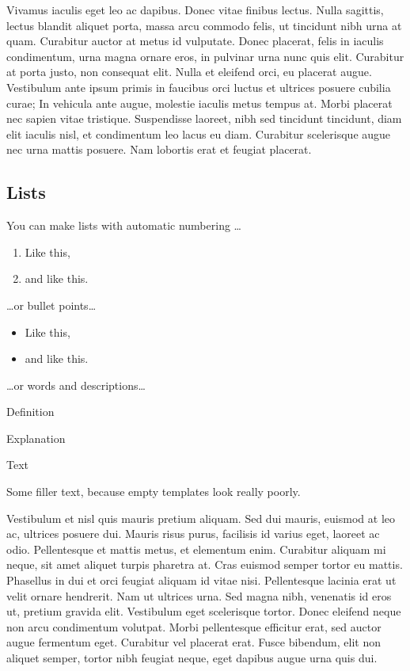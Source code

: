 \documentclass[9pt,biorxiv,doublespacing,lineno]{lapreprint}
\providecommand{\tightlist}{%
\setlength{\itemsep}{0pt}\setlength{\parskip}{0pt}}
\begin{document}
Vivamus iaculis eget leo ac dapibus. Donec vitae finibus lectus. Nulla
sagittis, lectus blandit aliquet porta, massa arcu commodo felis, ut
tincidunt nibh urna at quam. Curabitur auctor at metus id vulputate.
Donec placerat, felis in iaculis condimentum, urna magna ornare eros, in
pulvinar urna nunc quis elit. Curabitur at porta justo, non consequat
elit. Nulla et eleifend orci, eu placerat augue. Vestibulum ante ipsum
primis in faucibus orci luctus et ultrices posuere cubilia curae; In
vehicula ante augue, molestie iaculis metus tempus at. Morbi placerat
nec sapien vitae tristique. Suspendisse laoreet, nibh sed tincidunt
tincidunt, diam elit iaculis nisl, et condimentum leo lacus eu diam.
Curabitur scelerisque augue nec urna mattis posuere. Nam lobortis erat
et feugiat placerat.

\hypertarget{lists}{%
\subsection{Lists}\label{lists}}

You can make lists with automatic numbering \dots

\begin{enumerate}
\def\labelenumi{\arabic{enumi}.}
\tightlist
\item
  Like this,
\item
  and like this.
\end{enumerate}

\ldots or bullet points\ldots{}

\begin{itemize}
\tightlist
\item
  Like this,
\item
  and like this.
\end{itemize}

\ldots or words and descriptions\ldots{}

\begin{description}
\tightlist
\item[Word]
Definition
\item[Concept]
Explanation
\item[Idea]
Text
\end{description}

Some filler text, because empty templates look really poorly.

Vestibulum et nisl quis mauris pretium aliquam. Sed dui mauris, euismod
at leo ac, ultrices posuere dui. Mauris risus purus, facilisis id varius
eget, laoreet ac odio. Pellentesque et mattis metus, et elementum enim.
Curabitur aliquam mi neque, sit amet aliquet turpis pharetra at. Cras
euismod semper tortor eu mattis. Phasellus in dui et orci feugiat
aliquam id vitae nisi. Pellentesque lacinia erat ut velit ornare
hendrerit. Nam ut ultrices urna. Sed magna nibh, venenatis id eros ut,
pretium gravida elit. Vestibulum eget scelerisque tortor. Donec eleifend
neque non arcu condimentum volutpat. Morbi pellentesque efficitur erat,
sed auctor augue fermentum eget. Curabitur vel placerat erat. Fusce
bibendum, elit non aliquet semper, tortor nibh feugiat neque, eget
dapibus augue urna quis dui.
\end{document}
